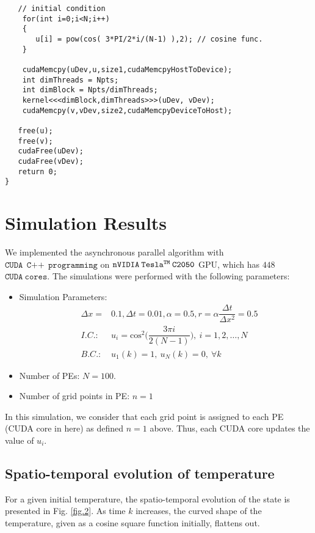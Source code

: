 \documentclass[1p]{elsarticle}
\begin{document}
\begin{itemize}
\begin{lstlisting}
   // initial condition
    for(int i=0;i<N;i++)
    {
	   u[i] = pow(cos( 3*PI/2*i/(N-1) ),2); // cosine func.
    }

    cudaMemcpy(uDev,u,size1,cudaMemcpyHostToDevice);
    int dimThreads = Npts;
    int dimBlock = Npts/dimThreads;
    kernel<<<dimBlock,dimThreads>>>(uDev, vDev);
    cudaMemcpy(v,vDev,size2,cudaMemcpyDeviceToHost);
 
   free(u);
   free(v);
   cudaFree(uDev);
   cudaFree(vDev);
   return 0;
}
\end{lstlisting}
\end{itemize}


\section{Simulation Results}
We implemented the asynchronous parallel algorithm with $\mathtt{CUDA\:\:C\text{++}\:\:programming}$ on $\mathtt{nVIDIA\: Tesla^{{\scriptsize{TM}}}\: C2050}$ GPU, which has $448$ $\mathtt{CUDA\: cores}$. 
The simulations were performed with the following parameters:
\begin{itemize}
\item{Simulation Parameters:}
\begin{eqnarray*}
&\Delta x =& 0.1, \Delta t = 0.01, \alpha = 0.5, r = \alpha\dfrac{\Delta t}{\Delta x^2} = 0.5\\
&I.C.:& u_i = \text{cos}^2\bigg( \dfrac{3\pi i}{2(N-1)} \bigg), \:i=1,2,\hdots,N\\
&B.C.:& u_1(k) = 1,\: u_N(k) = 0, \: \forall k
\end{eqnarray*}
\item{Number of PEs:} $N=100$.
\item{Number of grid points in PE:} $n=1$\\
\end{itemize}

In this simulation, we consider that each grid point is assigned to each PE (\textsf{CUDA} core in here) as defined $n=1$ above. Thus, each \textsf{CUDA} core updates the value of $u_i$.

\subsection{Spatio-temporal evolution of temperature}
For a given initial temperature, the spatio-temporal evolution of the state is presented in Fig. \ref{fig.2}. As time $k$ increases, the curved shape of the temperature, given as a cosine square function initially, flattens out. 
\end{document}
